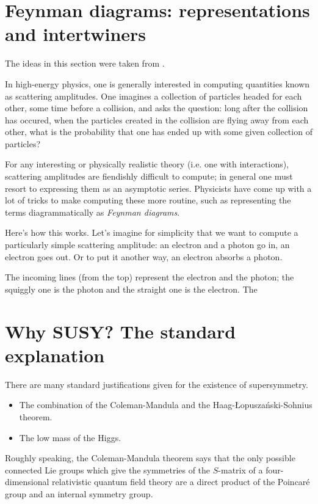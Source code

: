 \documentclass[a4paper,10pt]{scrreprt}
\theoremstyle{definition}
\theoremstyle{plain}
\theoremstyle{remark}
\begin{document}
\section{Feynman diagrams: representations and intertwiners}
The ideas in this section were taken from \cite{baez-lauda-prehistory}.

In high-energy physics, one is generally interested in computing quantities known as scattering amplitudes. One imagines a collection of particles headed for each other, some time before a collision, and asks the question: long after the collision has occured, when the particles created in the collision are flying away from each other, what is the probability that one has ended up with some given collection of particles? 

For any interesting or physically realistic theory (i.e. one with interactions), scattering amplitudes are fiendishly difficult to compute; in general one must resort to expressing them as an asymptotic series. Physicists have come up with a lot of tricks to make computing these more routine, such as representing the terms diagrammatically as \emph{Feynman diagrams}.

Here's how this works. Let's imagine for simplicity that we want to compute a particularly simple scattering amplitude: an electron and a photon go in, an electron goes out. Or to put it another way, an electron absorbs a photon.

The incoming lines (from the top) represent the electron and the photon; the squiggly one is the photon and the straight one is the electron. The 


\section{Why SUSY? The standard explanation}
There are many standard justifications given for the existence of supersymmetry. 

\begin{itemize}
  \item The combination of the Coleman-Mandula and the Haag-{\L}opusza{\'n}ski-Sohnius theorem.

  \item The low mass of the Higgs.
\end{itemize}

Roughly speaking, the Coleman-Mandula theorem says that the only possible connected Lie groups which give the symmetries of the $S$-matrix of a four-dimensional relativistic quantum field theory are a direct product of the Poincar{\'e} group and an internal symmetry group. 
\end{document}
